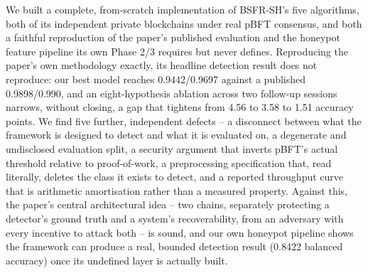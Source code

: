 \documentclass[conference]{IEEEtran}
\begin{document}
We built a complete, from-scratch implementation of BSFR-SH's five algorithms, both of its
independent private blockchains under real pBFT consensus, and both a faithful reproduction of
the paper's published evaluation and the honeypot feature pipeline its own Phase 2/3 requires but
never defines. Reproducing the paper's own methodology exactly, its headline detection result
does not reproduce: our best model reaches 0.9442/0.9697 against a published 0.9898/0.990, and an
eight-hypothesis ablation across two follow-up sessions narrows, without closing, a gap that
tightens from 4.56 to 3.58 to 1.51 accuracy points. We find five further, independent defects --
a disconnect between what the framework is designed to detect and what it is evaluated on, a
degenerate and undisclosed evaluation split, a security argument that inverts pBFT's actual
threshold relative to proof-of-work, a preprocessing specification that, read literally, deletes
the class it exists to detect, and a reported throughput curve that is arithmetic amortisation
rather than a measured property. Against this, the paper's central architectural idea -- two
chains, separately protecting a detector's ground truth and a system's recoverability, from an
adversary with every incentive to attack both -- is sound, and our own honeypot pipeline shows the
framework can produce a real, bounded detection result (0.8422 balanced accuracy) once its
undefined layer is actually built.
\end{document}
